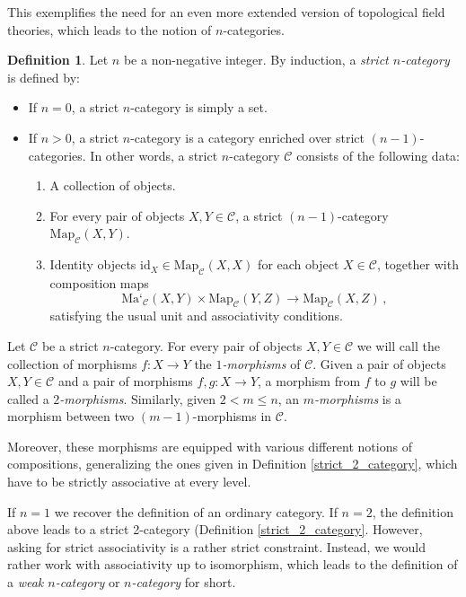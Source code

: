 \documentclass[a4paper,11pt]{article}
\newcommand{\ccal}{\mathcal{C}}
\newcommand{\ide}{\mathrm{id}}
\theoremstyle{plain}
\theoremstyle{definition}
\newtheorem{defi}[thm]{Definition}
\theoremstyle{remark}
\begin{document}
This exemplifies the need for an even more extended version of topological field theories, which leads to the notion of $n$-categories. 


\begin{defi}
Let $n$ be a non-negative integer. By induction, a \textit{strict $n$-category} is defined by: 
\begin{itemize}
    \item If $n = 0$, a strict $n$-category is simply a set. 
    \item If $n >0$, a strict $n$-category is a category enriched over strict $(n-1)$-categories. In other words, a strict $n$-category $\ccal$ consists of the following data: 
    \begin{enumerate}[label = \arabic*)]
        \item A collection of objects. 
        \item For every pair of objects $X, Y \in \ccal$, a strict $(n-1)$-category $\text{Map}_{\ccal}(X,Y)$. 
        \item Identity objects $\ide_X \in \text{Map}_{\ccal}(X,X)$ for each object $X \in \ccal$, together with composition maps 
        $$\text{Ma`}_{\ccal}(X,Y) \times \text{Map}_{\ccal}(Y,Z) \to \text{Map}_{\ccal}(X,Z) \, ,$$
        satisfying the usual unit and associativity conditions. 
    \end{enumerate}
\end{itemize}
Let $\ccal$ be a strict $n$-category. For every pair of objects $X, Y \in \ccal$ we will call the collection of morphisms $f \colon X \to Y$ the \textit{$1$-morphisms} of $\ccal$. Given a pair of objects $X, Y \in \ccal$ and a pair of morphisms $f, g \colon X \to Y$, a morphism from $f$ to $g$ will be called a \textit{$2$-morphisms}. Similarly, given $2 < m \leq n$, an \textit{$m$-morphisms} is a morphism between two $(m-1)$-morphisms in $\ccal$. 

Moreover, these morphisms are equipped with various different notions of compositions, generalizing the ones given in Definition \ref{strict_2_category}, which have to be strictly associative at every level. 
\end{defi}


If $n = 1$ we recover the definition of an ordinary category. If $n = 2$, the definition above leads to a strict 2-category (Definition \ref{strict_2_category}. However, asking for strict associativity is a rather strict constraint. Instead, we would rather work with associativity up to isomorphism, which leads to the definition of a \textit{weak $n$-category} or \textit{$n$-category} for short. 
\end{document}
